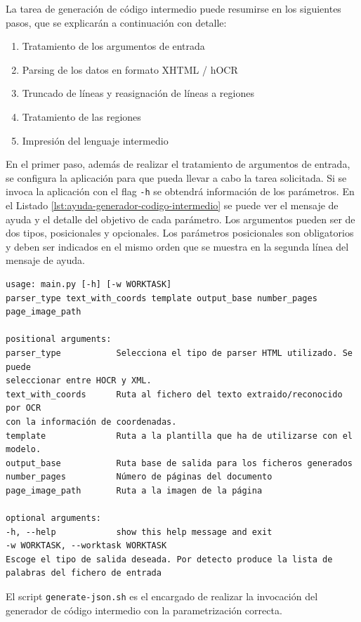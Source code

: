 La tarea de generación de código intermedio puede resumirse en los siguientes pasos, que se explicarán a continuación con detalle:

\begin{enumerate}
    \item Tratamiento de los argumentos de entrada
    \item Parsing de los datos en formato XHTML / hOCR
    \item Truncado de líneas y reasignación de líneas a regiones
    \item Tratamiento de las regiones
    \item Impresión del lenguaje intermedio
\end{enumerate}    

En el primer paso, además de realizar el tratamiento de argumentos de entrada, se configura la aplicación para que pueda llevar a cabo la tarea solicitada. Si se invoca la aplicación con el flag \verb|-h| se obtendrá información de los parámetros. En el Listado \ref{lst:ayuda-generador-codigo-intermedio} se puede ver el mensaje de ayuda y el detalle del objetivo de cada parámetro. Los argumentos pueden ser de dos tipos, posicionales y opcionales. Los parámetros posicionales son obligatorios y deben ser indicados en el mismo orden que se muestra en la segunda línea del mensaje de ayuda. 

\begin{lstlisting}[caption={Ayuda del generador de código intermedio},label=lst:ayuda-generador-codigo-intermedio]
usage: main.py [-h] [-w WORKTASK]
parser_type text_with_coords template output_base number_pages page_image_path

positional arguments:
parser_type           Selecciona el tipo de parser HTML utilizado. Se puede
seleccionar entre HOCR y XML.
text_with_coords      Ruta al fichero del texto extraido/reconocido por OCR
con la información de coordenadas.
template              Ruta a la plantilla que ha de utilizarse con el
modelo.
output_base           Ruta base de salida para los ficheros generados
number_pages          Número de páginas del documento
page_image_path       Ruta a la imagen de la página

optional arguments:
-h, --help            show this help message and exit
-w WORKTASK, --worktask WORKTASK
Escoge el tipo de salida deseada. Por detecto produce la lista de palabras del fichero de entrada
\end{lstlisting}

El script \verb|generate-json.sh| es el encargado de realizar la invocación del generador de código intermedio con la parametrización correcta.

